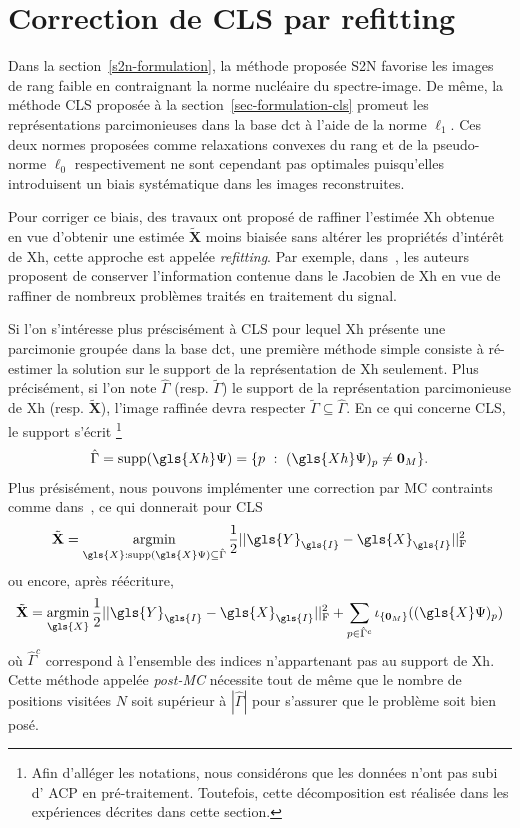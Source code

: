 \section{Correction de CLS par refitting}

Dans la section~\ref{s2n-formulation}, la méthode proposée S2N favorise les images de rang faible en contraignant la norme nucléaire du spectre-image. De même, la méthode CLS proposée à la section~\ref{sec-formulation-cls} promeut les représentations parcimonieuses dans la base \gls{dct} à l'aide de la norme $\ell_{1}$. Ces deux normes proposées comme relaxations convexes du rang et de la pseudo-norme $\ell_0$ respectivement ne sont cependant pas optimales puisqu'elles introduisent un biais systématique dans les images reconstruites.

Pour corriger ce biais, des travaux ont proposé de raffiner l'estimée \gls{Xh} obtenue en vue d'obtenir une estimée $\tilde{\mathbf{X}}$ moins biaisée sans altérer les propriétés d'intérêt de \gls{Xh}, cette approche est appelée \emph{refitting}. %
%
Par exemple, dans~\cite{deledalle2017clear}, les auteurs proposent de conserver l'information contenue dans le Jacobien de \gls{Xh} en vue de raffiner de nombreux problèmes traités en traitement du signal.


Si l'on s'intéresse plus préscisément à CLS pour lequel \gls{Xh} présente une parcimonie groupée dans la base \gls{dct}, une première méthode simple consiste à ré-estimer la solution sur le support de la représentation de \gls{Xh} seulement.
Plus précisément, si l'on note $\hat{\Gamma}$ (resp. $\tilde{\Gamma}$) le support de la représentation parcimonieuse de \gls{Xh} (resp. $\tilde{\mathbf{X}}$), l'image raffinée devra respecter $\tilde{\Gamma} \subseteq \hat{\Gamma}$. En ce qui concerne CLS, le support s'écrit%
%
\footnote{Afin d'alléger les notations, nous considérons que les données n'ont pas subi d' ACP en pré-traitement. Toutefois, cette décomposition est réalisée dans les expériences décrites dans cette section.}
%
\begin{equation}
    \hat{\Gamma} = \mathrm{supp}(\gls{Xh}\Psi)  = \{p\ :\ (\gls{Xh}\Psi)_p \neq \mathbf{0}_M \}.
\end{equation}
Plus présisément, nous pouvons implémenter une correction par MC contraints comme dans~\cite{belloni2013least}, ce qui donnerait pour CLS
\begin{equation}
    \tilde{\mathbf{X}} = \argmin_{\gls{X} : \mathrm{supp}(\gls{X}\Psi)\subseteq\hat{\Gamma}} 
    \frac{1}{2}\frobnorm{\gls{Y}_{\gls{I}} - \gls{X}_{\gls{I}}}
\end{equation}
ou encore, après réécriture,
\begin{equation}\label{eq-refining-simple}
    \tilde{\mathbf{X}} = \argmin_{\gls{X}} 
    \frac{1}{2}\frobnorm{\gls{Y}_{\gls{I}} - \gls{X}_{\gls{I}}} + 
    \sum_{p\in\hat{\Gamma}^c} \iota_{\{\mathbf{0}_M\}}((\gls{X}\Psi)_p)
\end{equation}
où $\hat{\Gamma}^c$ correspond à l'ensemble des indices n'appartenant pas au support de \gls{Xh}. Cette méthode appelée \emph{post-MC} nécessite tout de même que le nombre de positions visitées $N$ soit supérieur à $|\hat{\Gamma}|$ pour s'assurer que le problème soit bien posé.

